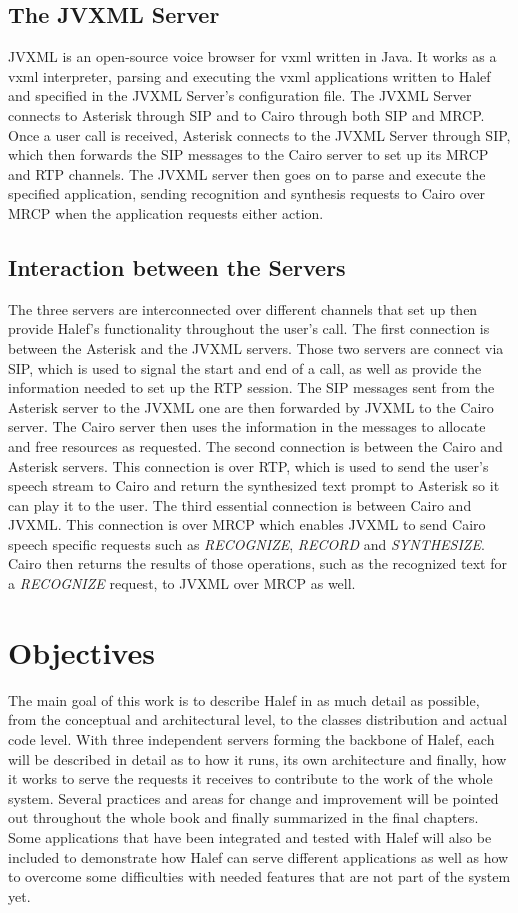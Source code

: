 \subsection{The JVXML Server}
JVXML is an open-source voice browser for \ac{vxml} written in Java.
It works as a \ac{vxml} interpreter, parsing and executing the \ac{vxml} applications written to Halef and specified in the JVXML Server's configuration file.
The JVXML Server connects to Asterisk through SIP and to Cairo through both SIP and MRCP.
Once a user call is received, Asterisk connects to the JVXML Server through SIP, which then forwards the SIP messages to the Cairo server to set up its MRCP and RTP channels.
The JVXML server then goes on to parse and execute the specified application, sending recognition and synthesis requests to Cairo over MRCP when the application requests either action.

\subsection{Interaction between the Servers}
The three servers are interconnected over different channels that set up then provide Halef's functionality throughout the user's call.
The first connection is between the Asterisk and the JVXML servers.
Those two servers are connect via SIP, which is used to signal the start and end of a call, as well as provide the information needed to set up the RTP session.
The SIP messages sent from the Asterisk server to the JVXML one are then forwarded by JVXML to the Cairo server.
The Cairo server then uses the information in the messages to allocate and free resources as requested.
The second connection is between the Cairo and Asterisk servers.
This connection is over RTP, which is used to send the user's speech stream to Cairo and return the synthesized text prompt to Asterisk so it can play it to the user.
The third essential connection is between Cairo and JVXML.
This connection is over MRCP which enables JVXML to send Cairo speech specific requests such as \textit{RECOGNIZE}, \textit{RECORD} and \textit{SYNTHESIZE}.
Cairo then returns the results of those operations, such as the recognized text for a \textit{RECOGNIZE} request, to JVXML over MRCP as well. 

\section{Objectives} \label{sec:s1}
The main goal of this work is to describe Halef in as much detail as possible, from the conceptual and architectural level, to the classes distribution and actual code level.
With three independent servers forming the backbone of Halef, each will be described in detail as to how it runs, its own architecture and finally, how it works to serve the requests it receives to contribute to the work of the whole system.
Several practices and areas for change and improvement will be pointed out throughout the whole book and finally summarized in the final chapters.
Some applications that have been integrated and tested with Halef will also be included to demonstrate how Halef can serve different applications as well as how to overcome some difficulties with needed features that are not part of the system yet.


